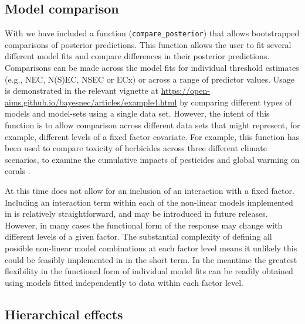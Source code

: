 \documentclass[
  shortnames]{jss}
\begin{document}
\hypertarget{model-comparison}{%
\subsection{Model comparison}\label{model-comparison}}

With  we have included a function (\texttt{compare\_posterior}) that allows bootstrapped comparisons of posterior predictions. This function allows the user to fit several different  model fits and compare differences in their posterior predictions. Comparisons can be made across the model fits for individual threshold estimates (e.g., NEC, N(S)EC, NSEC or ECx) or across a range of predictor values. Usage is demonstrated in the relevant vignette at \url{https://open-aims.github.io/bayesnec/articles/example4.html} by comparing different types of models and model-sets using a single data set. However, the intent of this function is to allow comparison across different data sets that might represent, for example, different levels of a fixed factor covariate. For example, this function has been used to compare toxicity of herbicides across three different climate scenarios, to examine the cumulative impacts of pesticides and global warming on corals \citep{flores2021}.

At this time  does not allow for an inclusion of an interaction with a fixed factor. Including an interaction term within each of the non-linear models implemented in  is relatively straightforward, and may be introduced in future releases. However, in many cases the functional form of the response may change with different levels of a given factor. The substantial complexity of defining all possible non-linear model combinations at each factor level means it unlikely this could be feasibly implemented in  in the short term. In the meantime the greatest flexibility in the functional form of individual model fits can be readily obtained using models fitted independently to data within each factor level.

\hypertarget{hierarchical-effects}{%
\subsection{Hierarchical effects}\label{hierarchical-effects}}
\end{document}
